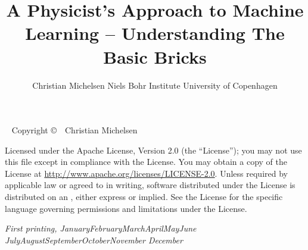 \documentclass[a4paper, twoside, nobib]{tufte-book}
\title[A Physicist's Approach To Machine Learning -- Understanding The Basic Bricks]{A Physicist's \newline \noindent 
       Approach to \newline \noindent 
       Machine Learning \newline \noindent
       --  \newline \noindent
       Understanding  \newline \noindent
       The Basic Bricks}
\author[Christian Michelsen]{\newline \noindent 
        Christian Michelsen \newline \noindent 
        Niels Bohr Institute \newline \noindent 
        University of Copenhagen \newline }
\newcommand{\monthyear}{%
  \ifcase\month\or January\or February\or March\or April\or May\or June\or
  July\or August\or September\or October\or November\or
  December\fi\space\number\year
}
\newcommand{\blankpage}{\newpage\hbox{}\thispagestyle{empty}\newpage}
\begin{document}





\maketitle


\newpage
\begin{fullwidth}
~\vfill
\thispagestyle{empty}
\setlength{\parindent}{0pt}
\setlength{\parskip}{\baselineskip}
Copyright \copyright\ \the\year\ \newline Christian Michelsen

\par{}

\par Licensed under the Apache License, Version 2.0 (the ``License''); you may not
use this file except in compliance with the License. You may obtain a copy
of the License at \url{http://www.apache.org/licenses/LICENSE-2.0}. Unless
required by applicable law or agreed to in writing, software distributed
under the License is distributed on an , either express or implied. See the
License for the specific language governing permissions and limitations
under the License.

\par\textit{First printing, \monthyear}
\end{fullwidth}
\end{document}
